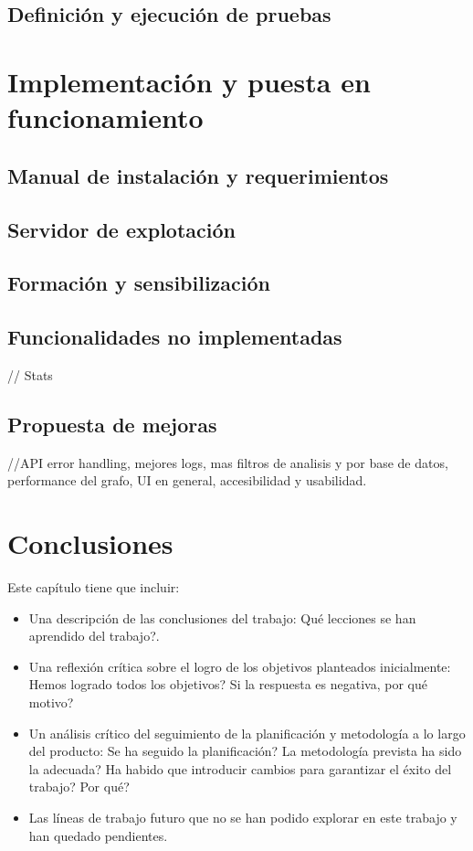 \documentclass[11pt,a4paper]{article}
\begin{document}
\subsection{Definición y ejecución de pruebas}
\newpage 





\section{Implementación y puesta en funcionamiento}
\subsection{Manual de instalación y requerimientos}

\subsection{Servidor de explotación}

\subsection{Formación y sensibilización}

\subsection{Funcionalidades no implementadas}
// Stats
\subsection{Propuesta de mejoras}
//API error handling, mejores logs, mas filtros de analisis y por base de datos, performance del grafo, UI en general, accesibilidad y usabilidad.
\newpage 




\section{Conclusiones}
Este capítulo tiene que incluir:
\begin{itemize}
\item Una descripción de las conclusiones del trabajo: Qué lecciones se han aprendido del trabajo?.
\item Una reflexión crítica sobre el logro de los objetivos planteados inicialmente: Hemos logrado todos los objetivos? Si la respuesta es negativa, por qué motivo? 
\item Un análisis crítico del seguimiento de la planificación y metodología a lo largo del producto: Se ha seguido la planificación? La metodología prevista ha sido la adecuada? Ha habido que introducir cambios para garantizar el éxito del trabajo? Por qué? 
\item Las líneas de trabajo futuro que no se han podido explorar en este trabajo y han quedado pendientes.
\end{itemize}
\end{document}
